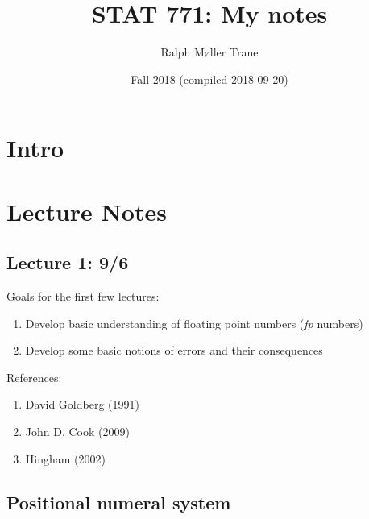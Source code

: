 \documentclass[]{book}
\title{STAT 771: My notes}
\author{Ralph Møller Trane}
\date{Fall 2018 (compiled 2018-09-20)}
\providecommand{\tightlist}{%
  \setlength{\itemsep}{0pt}\setlength{\parskip}{0pt}}
\theoremstyle{definition}
\theoremstyle{definition}
\theoremstyle{definition}
\theoremstyle{remark}
\begin{document}
\maketitle

{
\setcounter{tocdepth}{1}
\tableofcontents
}
\newcommand{\R}{\mathbb{R}}
\newcommand{\N}{\mathbb{N}}

\newcommand{\norm}[1]{\left \vert \left \vert #1 \right \vert \right \vert}

\newcommand{\argmin}{\text{argmin}}
\newcommand{\argmax}{\text{argmax}}

\chapter*{Intro}\label{intro}

\chapter{Lecture Notes}\label{lecture-notes}

\section*{Lecture 1: 9/6}\label{lecture-1-96}

Goals for the first few lectures:

\begin{enumerate}
\def\labelenumi{\arabic{enumi}.}
\tightlist
\item
  Develop basic understanding of floating point numbers (\emph{fp}
  numbers)
\item
  Develop some basic notions of errors and their consequences
\end{enumerate}

References:

\begin{enumerate}
\def\labelenumi{\roman{enumi}.}
\tightlist
\item
  David Goldberg (1991)
\item
  John D. Cook (2009)
\item
  Hingham (2002)
\end{enumerate}

\section{Positional numeral system}\label{positional-numeral-system}
\end{document}
